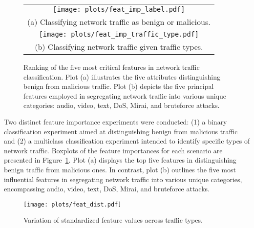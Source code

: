 \documentclass[lettersize,journal]{IEEEtran}
\begin{document}
\begin{figure}[!t]
    \footnotesize
    \centering
    \begin{tabular}{c}
         \texttt{[image: plots/feat\_imp\_label.pdf]} \\
         (a) Classifying network traffic as benign or malicious.  \label{fig:feat_importance_a}\\
         \texttt{[image: plots/feat\_imp\_traffic\_type.pdf]} \\
         (b) Classifying network traffic given traffic types.
    \end{tabular} 
    \caption{Ranking of the five most critical features in network traffic classification. Plot (a) illustrates the five attributes distinguishing benign from malicious traffic. Plot (b) depicts the five principal features employed in segregating network traffic into various unique categories: audio, video, text, DoS, Mirai, and bruteforce attacks.} 
    \label{fig:feat_importance}
\end{figure}  

Two distinct feature importance experiments were conducted: (1) a binary classification experiment aimed at distinguishing benign from malicious traffic and (2) a multiclass classification experiment intended to identify specific types of network traffic. Boxplots of the feature importances for each scenario are presented in Figure~\ref{fig:feat_importance}. Plot (a) displays the top five features in distinguishing benign traffic from malicious ones. In contrast, plot (b) outlines the five most influential features in segregating network traffic into various unique categories, encompassing audio, video, text, \ac{DoS}, Mirai, and bruteforce attacks.

\begin{figure*}[!t]
    \centering
    \texttt{[image: plots/feat\_dist.pdf]}
    \caption{Variation of standardized feature values across traffic types.}
    \label{fig:feats_variation}
\end{figure*} 
\end{document}
